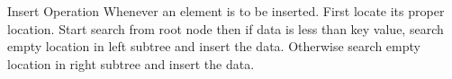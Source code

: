 \documentclass{beamer}
\begin{document}
\begin{frame}
Insert Operation
Whenever an element is to be inserted. First locate its proper location. Start search from root node then if data is less than key value, search empty location in left subtree and insert the data. Otherwise search empty location in right subtree and insert the data.
\end{frame}
%
%
%
%			
%				
\end{document}
